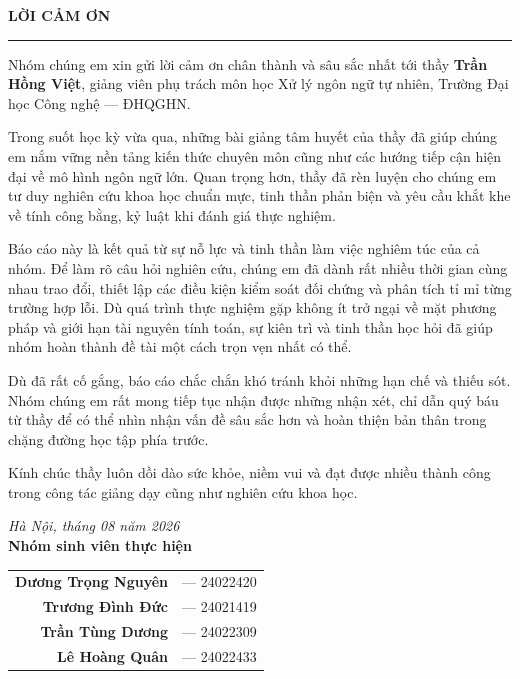 \documentclass[11pt,a4paper]{article}
\begin{document}
\newpage
\thispagestyle{empty}
\vspace*{1.5cm}

\begin{center}
  {\LARGE\bfseries LỜI CẢM ƠN\par}
  \vspace{10pt}
  \rule{0.3\linewidth}{0.6pt}\par
\end{center}
\vspace{1.2cm}

Nhóm chúng em xin gửi lời cảm ơn chân thành và sâu sắc nhất tới thầy \textbf{Trần Hồng Việt}, giảng viên phụ trách môn học Xử lý ngôn ngữ tự nhiên, Trường Đại học Công nghệ --- ĐHQGHN.

Trong suốt học kỳ vừa qua, những bài giảng tâm huyết của thầy đã giúp chúng em nắm vững nền tảng kiến thức chuyên môn cũng như các hướng tiếp cận hiện đại về mô hình ngôn ngữ lớn. Quan trọng hơn, thầy đã rèn luyện cho chúng em tư duy nghiên cứu khoa học chuẩn mực, tinh thần phản biện và yêu cầu khắt khe về tính công bằng, kỷ luật khi đánh giá thực nghiệm.

Báo cáo này là kết quả từ sự nỗ lực và tinh thần làm việc nghiêm túc của cả nhóm. Để làm rõ câu hỏi nghiên cứu, chúng em đã dành rất nhiều thời gian cùng nhau trao đổi, thiết lập các điều kiện kiểm soát đối chứng và phân tích tỉ mỉ từng trường hợp lỗi. Dù quá trình thực nghiệm gặp không ít trở ngại về mặt phương pháp và giới hạn tài nguyên tính toán, sự kiên trì và tinh thần học hỏi đã giúp nhóm hoàn thành đề tài một cách trọn vẹn nhất có thể.

Dù đã rất cố gắng, báo cáo chắc chắn khó tránh khỏi những hạn chế và thiếu sót. Nhóm chúng em rất mong tiếp tục nhận được những nhận xét, chỉ dẫn quý báu từ thầy để có thể nhìn nhận vấn đề sâu sắc hơn và hoàn thiện bản thân trong chặng đường học tập phía trước.

Kính chúc thầy luôn dồi dào sức khỏe, niềm vui và đạt được nhiều thành công trong công tác giảng dạy cũng như nghiên cứu khoa học.

\vspace{1.8cm}
\begin{flushright}
\textit{Hà Nội, tháng 08 năm 2026}\\[6pt]
\textbf{Nhóm sinh viên thực hiện}\\[8pt]
\begin{tabular}{rl}
\textbf{Dương Trọng Nguyên} & --- 24022420\\
\textbf{Trương Đình Đức}    & --- 24021419\\
\textbf{Trần Tùng Dương}    & --- 24022309\\
\textbf{Lê Hoàng Quân}      & --- 24022433
\end{tabular}
\end{flushright}
\end{document}
